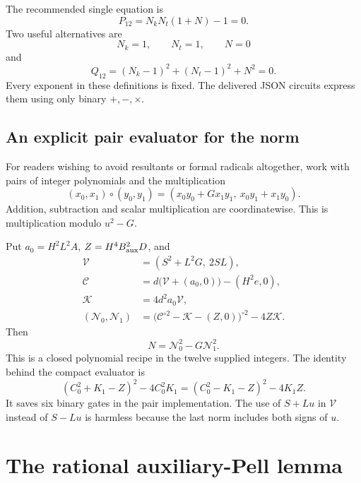 \documentclass[11pt]{article}
\theoremstyle{remark}\newtheorem{remark}[theorem]{Remark}
\begin{document}
The recommended single equation is
\begin{equation}\label{eq:product}
 \boxed{\quad P_{12}=N_kN_t(1+N)-1=0.\quad}
\end{equation}
Two useful alternatives are
\begin{equation}\label{eq:system}
 \boxed{\quad N_k=1,\qquad N_t=1,\qquad N=0\quad}
\end{equation}
and
\begin{equation}\label{eq:sos}
 Q_{12}=(N_k-1)^2+(N_t-1)^2+N^2=0.
\end{equation}
Every exponent in these definitions is fixed. The delivered JSON
circuits express them using only binary \(+,-,\times\).

\subsection{An explicit pair evaluator for the norm}

For readers wishing to avoid resultants or formal radicals altogether,
work with pairs of integer polynomials and the multiplication
\[
 (x_0,x_1)\circ(y_0,y_1)
   =(x_0y_0+Gx_1y_1,\ x_0y_1+x_1y_0).
\]
Addition, subtraction and scalar multiplication are coordinatewise.
This is multiplication modulo \(u^2-G\).

Put \(a_0=H^2L^2A\), \(Z=H^4B_{\rm aux}^2D\), and
\begin{align*}
 \mathcal V&=(S^2+L^2G,\ 2SL),\\
 \mathcal C&=d\bigl(\mathcal V+(a_0,0)\bigr)-(H^2e,0),\\
 \mathcal K&=4d^2a_0\mathcal V,\\
 (\mathcal N_0,\mathcal N_1)
   &=\bigl(\mathcal C^{\circ2}-\mathcal K-(Z,0)\bigr)^{\circ2}
                                    -4Z\mathcal K.
\end{align*}
Then
\begin{equation}\label{eq:paireval}
 N=\mathcal N_0^2-G\mathcal N_1^2.
\end{equation}
This is a closed polynomial recipe in the twelve supplied integers.
The identity behind the compact evaluator is
\[
 (C_0^2+K_1-Z)^2-4C_0^2K_1
       =(C_0^2-K_1-Z)^2-4K_1Z.
\]
It saves six binary gates in the pair implementation. The use of
\(S+Lu\) in \(\mathcal V\) instead of \(S-Lu\) is harmless because the
last norm includes both signs of \(u\).

\section{The rational auxiliary-Pell lemma}\label{sec:pell}
\end{document}
